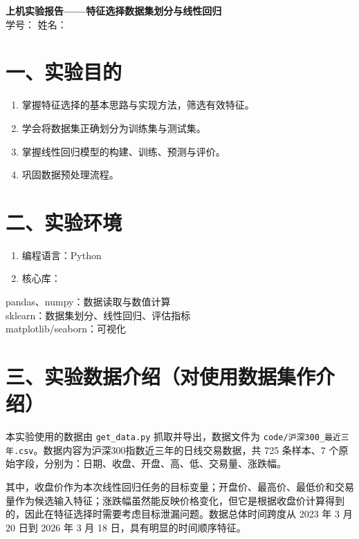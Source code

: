 \documentclass[12pt,a4paper]{ctexart}
\begin{document}
\begin{center}
{\LARGE \textbf{上机实验报告——特征选择数据集划分与线性回归}}\\[1em]
学号：\underline{\hspace{4cm}} \hspace{2cm} 姓名：\underline{\hspace{3cm}}
\end{center}

\vspace{1em}

\section*{一、实验目的}
\begin{enumerate}[label=（\arabic*）]
\item 掌握特征选择的基本思路与实现方法，筛选有效特征。
\item 学会将数据集正确划分为训练集与测试集。
\item 掌握线性回归模型的构建、训练、预测与评价。
\item 巩固数据预处理流程。
\end{enumerate}

\section*{二、实验环境}
\begin{enumerate}[label=（\arabic*）]
\item 编程语言：Python
\item 核心库：
\end{enumerate}

\noindent pandas、numpy：数据读取与数值计算\\
\noindent sklearn：数据集划分、线性回归、评估指标\\
\noindent matplotlib/seaborn：可视化

\section*{三、实验数据介绍（对使用数据集作介绍）}
本实验使用的数据由 \texttt{get\_data.py} 抓取并导出，数据文件为 \texttt{code/沪深300\_最近三年.csv}。数据内容为沪深300指数近三年的日线交易数据，共 725 条样本、7 个原始字段，分别为：日期、收盘、开盘、高、低、交易量、涨跌幅。

其中，收盘价作为本次线性回归任务的目标变量；开盘价、最高价、最低价和交易量作为候选输入特征；涨跌幅虽然能反映价格变化，但它是根据收盘价计算得到的，因此在特征选择时需要考虑目标泄漏问题。数据总体时间跨度从 2023 年 3 月 20 日到 2026 年 3 月 18 日，具有明显的时间顺序特征。
\end{document}
